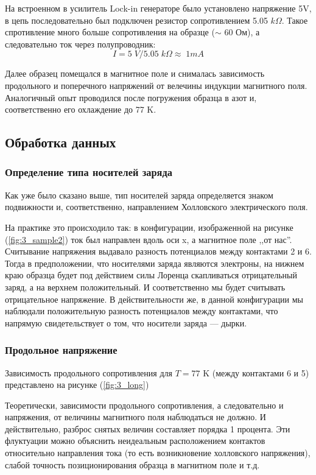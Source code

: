 \documentclass[a4paper, 12pt]{article}
\begin{document}
На встроенном в усилитель Lock-in генераторе было установлено напряжение 5V, в цепь последовательно был подключен резистор сопротивлением 5.05 $k\Omega$. Такое спротивление много больше сопротивления на образце ($\sim$ 60 Ом), а следовательно ток через полупроводник: $$I=5 \;V/5.05 \; k\Omega\approx \;1mA$$

Далее образец помещался в магнитное поле и снималась зависимость продольного и поперечного напряжений от велечины индукции магнитного поля. Аналогичный опыт проводился после погружения образца в азот и, соответственно его охлаждение до 77 K.

\subsection{Обработка данных}
\subsubsection{Определение типа носителей заряда}
Как уже было сказано выше, тип носителей заряда определяется знаком подвижности и, соответственно, направлением Холловского электрического поля. 

На практике это происходило так: в конфигурации, изображенной на рисунке (\ref{fig:3_sample2}) ток был направлен вдоль оси x, а магнитное поле ,,от нас''. Считывание напряжения выдавало разность потенциалов между контактами 2 и 6. Тогда в предположении, что носителями заряда являются электроны, на нижнем краю образца будет под действием силы Лоренца скапливаться отрицательный заряд, а на верхнем положительный. И соответственно мы будет считывать отрицательное напряжение. В действительности же, в данной конфигурации мы наблюдали положительную разность потенциалов между контактами, что напрямую свидетельствует о том, что носители заряда --- дырки.
\subsubsection{Продольное напряжение}

Зависимость продольного сопротивления для $T=77$ K (между контактами 6 и 5) представлено на рисунке (\ref{fig:3_long})

Теоретически, зависимости продольного сопротивления, а следовательно и напряжения, от величины магнитного поля наблюдаться не должно. И действительно, разброс снятых величин составляет порядка 1 процента. Эти флуктуации можно объяснить неидеальным расположением контактов относительно направления тока (то есть возникновение холловского напряжения), слабой точность позиционирования образца в магнитном поле и т.д. 
\end{document}
